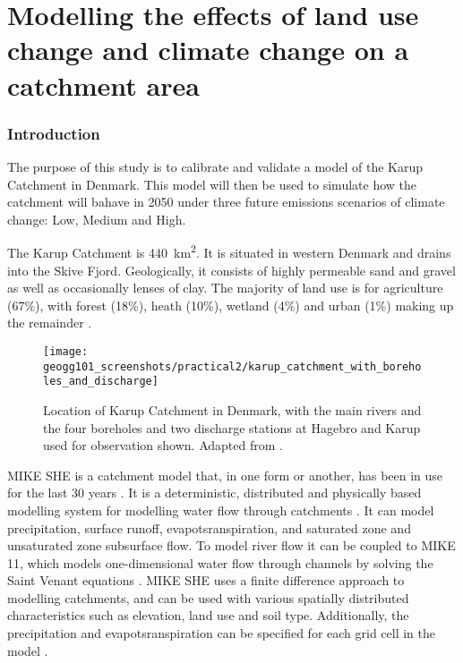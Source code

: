 \documentclass{article}
\begin{document}
\printbibliography[filter=practical1]

\newpage
\setcounter{section}{0}
\setcounter{figure}{0}

\part*{Modelling the effects of land use change and climate change on a catchment area}

\section{Introduction}

The purpose of this study is to calibrate and validate a model of the Karup Catchment in Denmark. This model will then be used to simulate how the catchment will bahave in 2050 under three future emissions scenarios of climate change: Low, Medium and High.  

The Karup Catchment is \SI{440}{km^2}. It is situated in western Denmark and drains into the Skive Fjord. Geologically, it consists of highly permeable sand and gravel as well as occasionally lenses of clay. 
The majority of land use is for agriculture (67\%), with forest (18\%), heath (10\%), wetland (4\%) and urban (1\%) making up the remainder \parencite{refsgaard1997parameterisation}.

\begin{figure}[!h]
    \centering
    \texttt{[image: geogg101\_screenshots/practical2/karup\_catchment\_with\_boreholes\_and\_discharge]}
    \caption{Location of Karup Catchment in Denmark, with the main rivers and the four boreholes and two discharge stations at Hagebro and Karup used for observation shown. Adapted from \textcite{blasone2008uncertainty}.}
    \label{fig:karup_catchment}
\end{figure}

MIKE SHE is a catchment model that, in one form or another, has been in use for the last 30 years \parencite{refsgaard2010systeme}. It is a deterministic, distributed and physically based modelling system for modelling water flow through catchments \parencite{refsgaard1995mike}. It can model precipitation, surface runoff, evapotsranspiration, and saturated zone and unsaturated zone subsurface flow. To model river flow it can be coupled to MIKE 11, which models one-dimensional water flow through channels by solving the Saint Venant equations \parencite{havno1995mike}.  
MIKE SHE uses a finite difference approach to modelling catchments, and can be used with various spatially distributed characteristics such as elevation, land use and soil type. Additionally, the precipitation and evapotsranspiration can be specified for each grid cell in the model \parencite{thompson2012modelling}.
\end{document}
